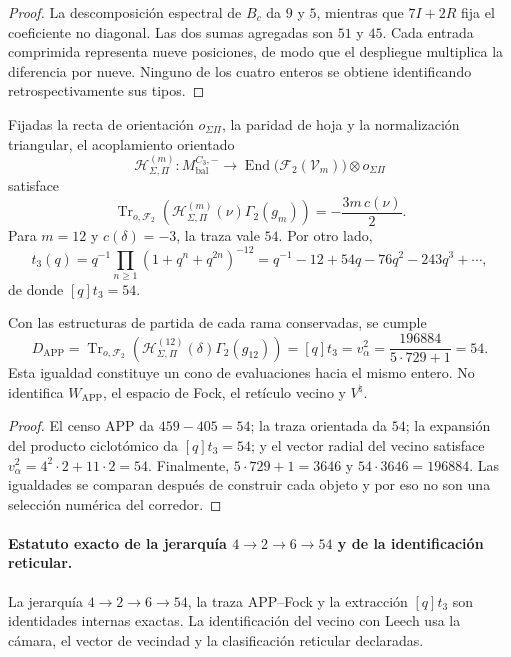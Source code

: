 \begin{proof}
La descomposición espectral de \(B_c\) da \(9\) y \(5\), mientras que
\(7I+2R\) fija el coeficiente no diagonal. Las dos sumas agregadas son \(51\)
y \(45\). Cada entrada comprimida representa nueve posiciones, de modo que el
despliegue multiplica la diferencia por nueve. Ninguno de los cuatro enteros
se obtiene identificando retrospectivamente sus tipos.
\end{proof}

Fijadas la recta de orientación \(o_{\Sigma\Pi}\), la paridad de hoja y la
normalización triangular, el acoplamiento orientado
\[
 \mathcal H_{\Sigma,\Pi}^{(m)}:
 M_{\mathrm{bal}}^{C_3,-}
 \longrightarrow
 \operatorname{End}\!\bigl(\mathcal F_2(\mathcal V_m)\bigr)
 \otimes o_{\Sigma\Pi}
\]
satisface
\[
 \operatorname{Tr}_{o,\mathcal F_2}
 \left(\mathcal H_{\Sigma,\Pi}^{(m)}(\nu)\Gamma_2(g_m)\right)
 =-\frac{3m\,c(\nu)}2.
\]
Para \(m=12\) y \(c(\delta)=-3\), la traza vale \(54\). Por otro lado,
\[
 t_3(q)=q^{-1}\prod_{n\ge1}(1+q^n+q^{2n})^{-12}
       =q^{-1}-12+54q-76q^2-243q^3+\cdots,
\]
de donde \([q]t_3=54\).

\begin{theorem}
\label{thm:cierre-vtm-indice-comun-54}
Con las estructuras de partida de cada rama conservadas, se cumple
\[
 \boxed{
 D_{\mathrm{APP}}
 =\operatorname{Tr}_{o,\mathcal F_2}
   \left(\mathcal H_{\Sigma,\Pi}^{(12)}(\delta)\Gamma_2(g_{12})\right)
 =[q]t_3
 =v_\alpha^2
 =\frac{196884}{5\cdot729+1}
 =54.}
\]
Esta igualdad constituye un cono de evaluaciones hacia el mismo entero. No
identifica \(W_{\mathrm{APP}}\), el espacio de Fock, el retículo vecino y
\(V^\natural\).
\end{theorem}

\begin{proof}
El censo APP da \(459-405=54\); la traza orientada da \(54\); la expansión
del producto ciclotómico da \([q]t_3=54\); y el vector radial del vecino
satisface \(v_\alpha^2=4^2\cdot2+11\cdot2=54\). Finalmente,
\(5\cdot729+1=3646\) y \(54\cdot3646=196884\). Las igualdades se comparan
después de construir cada objeto y por eso no son una selección numérica del
corredor.
\end{proof}

\paragraph{Estatuto exacto de la jerarquía \(4\to2\to6\to54\) y de la identificación reticular.}
La jerarquía \(4\to2\to6\to54\), la traza APP--Fock y la extracción
\([q]t_3\) son identidades internas exactas. La identificación del vecino con
Leech usa la cámara, el vector de vecindad y la clasificación reticular
declaradas.
%
